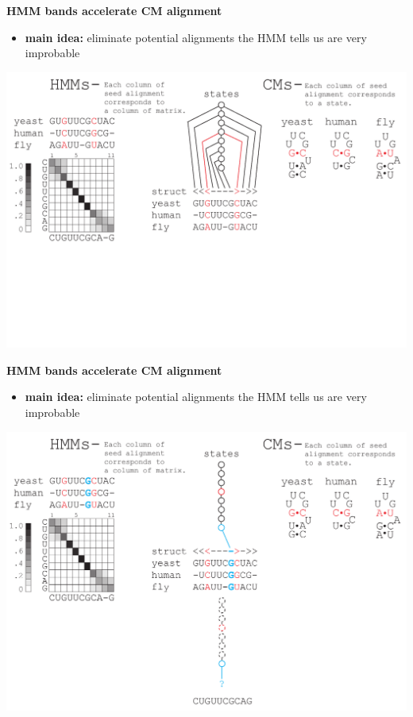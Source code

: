 \documentclass[landscape]{slides}
\begin{document}
\begin{slide}
\begin{center}

\textbf{HMM bands accelerate CM alignment}
\end{center}
\medskip
\small
\begin{itemize}
\item
\textbf{main idea:} eliminate potential alignments the HMM tells us are very improbable
\end{itemize}
\begin{center}
\includegraphics[width=8in]{figs/post_hmm_to_cm_map2_layer10}
\end{center}
\vfill
\end{slide}
\begin{slide}
\begin{center}

\textbf{HMM bands accelerate CM alignment}
\end{center}
\medskip
\small
\begin{itemize}
\item
\textbf{main idea:} eliminate potential alignments the HMM tells us are very improbable
\end{itemize}
\begin{center}
\includegraphics[width=8in]{figs/post_hmm_to_cm_map2_layer11}
\end{center}
\vfill
\end{slide}
\end{document}
